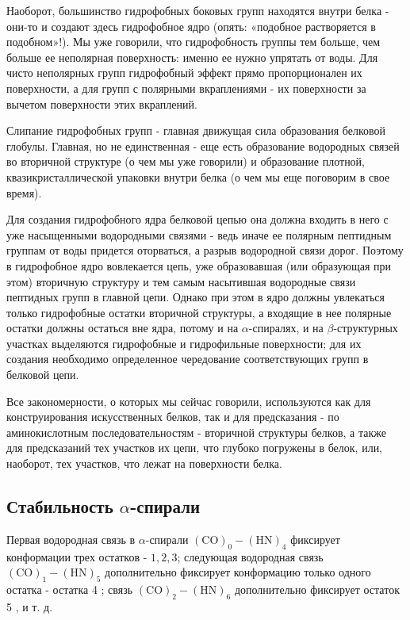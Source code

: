 \documentclass[
11pt,%
tightenlines,%
twoside,%
onecolumn,%
nofloats,%
nobibnotes,%
nofootinbib,%
superscriptaddress,%
noshowpacs,%
centertags]%
{revtex4}
\begin{document}
Наоборот, большинство гидрофобных боковых групп находятся внутри белка - они-то и создают здесь гидрофобное ядро (опять: «подобное растворяется в подобном»!). Мы уже говорили, что гидрофобность группы тем больше, чем больше ее неполярная поверхность: именно ее нужно упрятать от воды. Для чисто неполярных групп гидрофобный эффект прямо пропорционален их поверхности, а для групп с полярными вкраплениями - их поверхности за вычетом поверхности этих вкраплений.

Слипание гидрофобных групп - главная движущая сила образования белковой глобулы. Главная, но не единственная - еще есть образование водородных связей во вторичной структуре (о чем мы уже говорили) и образование плотной, квазикристаллической упаковки внутри белка (о чем мы еще поговорим в свое время).

Для создания гидрофобного ядра белковой цепью она должна входить в него с уже насыщенными водородными связями - ведь иначе ее полярным пептидным группам от воды придется оторваться, а разрыв водородной связи дорог. Поэтому в гидрофобное ядро вовлекается цепь, уже образовавшая (или образующая при этом) вторичную структуру и тем самым насытившая водородные связи пептидных групп в главной цепи. Однако при этом в ядро должны увлекаться только гидрофобные остатки вторичной структуры, а входящие в нее полярные остатки должны остаться вне ядра, потому и на $\alpha$-спиралях, и на $\beta$-структурных участках выделяются гидрофобные и гидрофильные поверхности; для их создания необходимо определенное чередование соответствующих групп в белковой цепи.

Все закономерности, о которых мы сейчас говорили, используются как для конструирования искусственных белков, так и для предсказания - по аминокислотным последовательностям - вторичной структуры белков, а также для предсказаний тех участков их цепи, что глубоко погружены в белок, или, наоборот, тех участков, что лежат на поверхности белка.


\subsection{Стабильность $\alpha$-спирали}
Первая водородная связь в $\alpha$-спирали $(\mathrm{CO})_0-(\mathrm{HN})_4$ фиксирует конформации трех остатков - $1,2,3$; следующая водородная связь $(\mathrm{CO})_1-(\mathrm{HN})_5$ дополнительно фиксирует конформацию только одного остатка - остатка 4 ; связь $(\mathrm{CO})_2-(\mathrm{HN})_6$ дополнительно фиксирует остаток 5 , и т. д.
\end{document}
